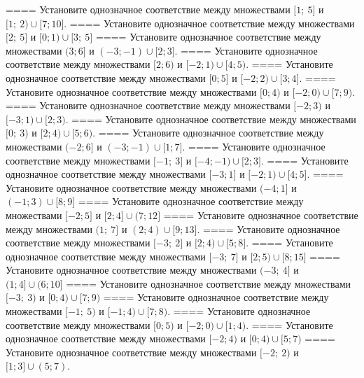 ====
Установите однозначное соответствие между множествами \(\lbrack 1;\ 5\rbrack\) и \(\lbrack 1;\ 2) \cup \lbrack 7;10\rbrack\).
====
Установите однозначное соответствие между множествами \(\lbrack 2;\ 5\rbrack\) и \(\lbrack 0;1) \cup \lbrack 3;\ 5\rbrack\)
====
Установите однозначное соответствие между множествами \((3;6\rbrack\) и \(( - 3; - 1) \cup \lbrack 2;3\rbrack\).
====
Установите однозначное соответствие между множествами \(\lbrack 2;6)\) и \(\lbrack - 2;1) \cup \lbrack 4;5)\).
====
Установите однозначное соответствие между множествами \(\lbrack 0;5\rbrack\) и \(\lbrack - 2;2) \cup \lbrack 3;4\rbrack\).
====
Установите однозначное соответствие между множествами \(\lbrack 0;4)\) и \(\lbrack - 2;0) \cup \lbrack 7;9)\).
====
Установите однозначное соответствие между множествами \(\lbrack - 2;3)\) и \(\lbrack - 3;1) \cup \lbrack 2;3)\).
====
Установите однозначное соответствие между множествами \(\lbrack 0;\ 3)\) и \(\lbrack 2;4) \cup \lbrack 5;6)\).
====
Установите однозначное соответствие между множествами \(( - 2;6\rbrack\) и \(( - 3; - 1) \cup \lbrack 1;7\rbrack\).
====
Установите однозначное соответствие между множествами \(\lbrack - 1;\ 3\rbrack\) и \(\lbrack - 4; - 1) \cup \lbrack 2;3\rbrack\).
====
Установите однозначное соответствие между множествами \(\lbrack - 3;1\rbrack\) и \(\lbrack - 2;1) \cup \lbrack 4;5\rbrack\).
====
Установите однозначное соответствие между множествами \(( - 4;1\rbrack\) и \(( - 1;3) \cup \lbrack 8;9\rbrack\)
====
Установите однозначное соответствие между множествами \(\lbrack - 2;5\rbrack\) и \(\lbrack 2;4\rbrack \cup (7;12\rbrack\)
====
Установите однозначное соответствие между множествами \((1;\ 7\rbrack\) и \((2;4) \cup \lbrack 9;13\rbrack\).
====
Установите однозначное соответствие между множествами \(\lbrack - 3;\ 2\rbrack\) и \(\lbrack 2;4) \cup \lbrack 5;8\rbrack\).
====
Установите однозначное соответствие между множествами \(\lbrack - 3;\ 7\rbrack\) и \(\lbrack 2;5) \cup \lbrack 8;15\rbrack\)
====
Установите однозначное соответствие между множествами \(( - 3;\ 4\rbrack\) и \((1;4\rbrack \cup (6;10\rbrack\)
====
Установите однозначное соответствие между множествами \(\lbrack - 3;\ 3)\) и \(\lbrack 0;4) \cup \lbrack 7;9)\)
====
Установите однозначное соответствие между множествами \(\lbrack - 1;\ 5)\) и \(\lbrack - 1;4) \cup \lbrack 7;8)\).
====
Установите однозначное соответствие между множествами \(\lbrack 0;5)\) и \(\lbrack - 2;0) \cup \lbrack 1;4)\).
====
Установите однозначное соответствие между множествами \(\lbrack - 2;4)\) и \(\lbrack 0;4) \cup \lbrack 5;7)\)
====
Установите однозначное соответствие между множествами \(\lbrack - 2;\ 2)\) и \(\lbrack 1;3\rbrack \cup (5;7)\).
